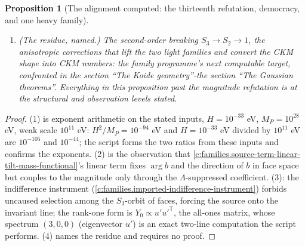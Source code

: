 \documentclass[11pt]{article}
\newtheorem{proposition}[theorem]{Proposition}
\theoremstyle{definition}
\theoremstyle{plain}
\begin{document}
\begin{proposition}[The alignment computed: the thirteenth refutation, democracy, and one heavy family]
\begin{enumerate}
\item \emph{(The residue, named.)} The second-order breaking $S_{3} \to S_{2} \to 1$, the anisotropic corrections that lift the two light families and convert the CKM shape into CKM numbers: the family programme's next computable target, confronted in the section ``The Koide geometry''-the section ``The Gaussian theorems''. Everything in this proposition past the magnitude refutation is at the structural and observation levels stated.
\end{enumerate}
\end{proposition}
\begin{proof}
(1) is exponent arithmetic on the stated inputs, $H = 10^{-33}$ eV, $M_{P} = 10^{28}$ eV, weak scale $10^{11}$ eV: $H^{2}/M_{P} = 10^{-94}$ eV and $H = 10^{-33}$ eV divided by $10^{11}$ eV are $10^{-105}$ and $10^{-44}$; the script forms the two ratios from these inputs and confirms the exponents. (2) is the observation that \ref{c:families.source-term-linear-tilt-mass-functional}'s linear term fixes $\arg b$ and the direction of $b$ in face space but couples to the magnitude only through the $\Lambda$-suppressed coefficient. (3): the indifference instrument (\ref{c:families.imported-indifference-instrument}) forbids uncaused selection among the $S_{3}$-orbit of faces, forcing the source onto the invariant line; the rank-one form is $Y_{0} \propto u'u'^{\mathsf{T}}$, the all-ones matrix, whose spectrum $(3, 0, 0)$ (eigenvector $u'$) is an exact two-line computation the script performs. (4) names the residue and requires no proof.

\end{proof}
\end{document}
